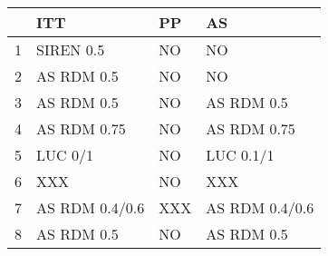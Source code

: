 \begin{tabular}{rlll}
  \hline
 & ITT & PP & AS \\ 
  \hline
1 & SIREN 0.5 & NO & NO \\ 
  2 & AS RDM 0.5 & NO & NO \\ 
  3 & AS RDM 0.5 & NO & AS RDM 0.5 \\ 
  4 & AS RDM 0.75 & NO & AS RDM 0.75 \\ 
  5 & LUC 0/1 & NO & LUC 0.1/1 \\ 
  6 & XXX & NO & XXX \\ 
  7 & AS RDM 0.4/0.6 & XXX & AS RDM 0.4/0.6 \\ 
  8 & AS RDM 0.5 & NO & AS RDM 0.5 \\ 
   \hline
\end{tabular}
